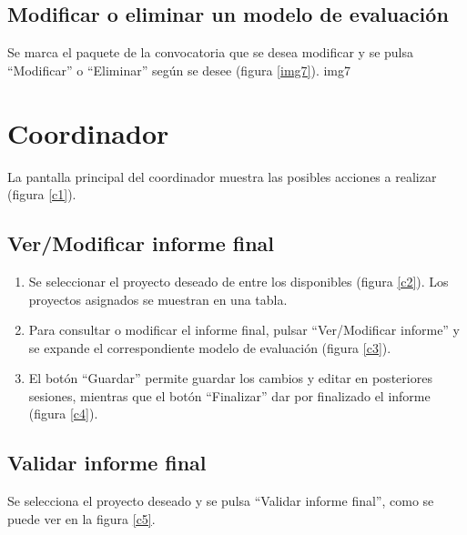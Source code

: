 \documentclass[12pt,a4paper,titlepage,spanish,twoside]{book}
\begin{document}
\subsection{Modificar o eliminar un modelo de evaluación}
Se marca el paquete de la convocatoria que se desea modificar y se pulsa 
``Modificar'' o ``Eliminar'' según se desee (figura \ref{img7}).
{img7}{}

\section{Coordinador}
La pantalla principal del coordinador muestra las posibles acciones a realizar 
(figura \ref{c1}).

\subsection{Ver/Modificar informe final}
\begin{enumerate}
\item Se seleccionar el proyecto deseado de entre los disponibles (figura 
  \ref{c2}). Los proyectos asignados se muestran en una tabla.
  

\item Para consultar o modificar el informe final, pulsar 
  ``Ver/Modificar informe'' y se expande el correspondiente modelo de 
  evaluación (figura \ref{c3}).


\item El botón ``Guardar'' permite guardar los cambios y editar en 
  posteriores sesiones, mientras que el botón ``Finalizar'' dar por finalizado 
  el informe (figura \ref{c4}).
  
\end{enumerate}

\subsection{Validar informe final}
Se selecciona el proyecto deseado y se pulsa ``Validar informe final'', como se 
puede ver en la figura \ref{c5}.
\end{document}
